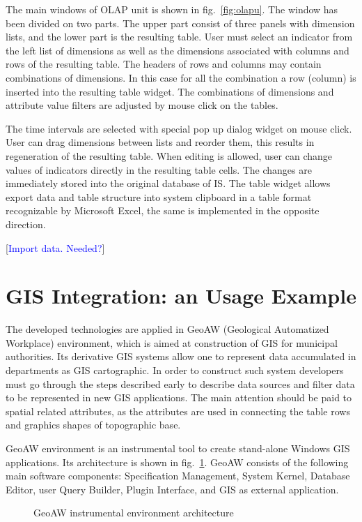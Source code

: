 \documentclass[conference]{IEEEtran}
\newcommand{\e}[2][fcolor]{\textcolor{pcolor}{[}\textcolor{#1}{#2}\textcolor{pcolor}{]}}
\begin{document}
The main windows of OLAP unit is shown in fig.~\ref{fig:olapu}.  The window has been divided on two parts.  The upper part consist of three panels with dimension lists, and the lower part is the resulting table.  User must select an indicator from the left list of dimensions as well as the dimensions associated with columns and rows of the resulting table.  The headers of rows and columns may contain combinations of dimensions.  In this case for all the combination a row (column) is inserted into the resulting table widget.  The combinations of dimensions and attribute value filters are adjusted by mouse click on the tables.

The time intervals are selected with special pop up dialog widget on mouse click.  User can drag dimensions between lists and reorder them, this results in regeneration of the resulting table.  When editing is allowed, user can change values of indicators directly in the resulting table cells.  The changes are immediately stored into the original database of IS.  The table widget allows export data and table structure into system clipboard in a table format recognizable by Microsoft Excel, the same is implemented in the opposite direction.

\e[blue]{Import data. Needed?}


\section{GIS Integration: an Usage Example}
\label{sec:gis-integration}

The developed technologies are applied in GeoAW (Geological Automatized Workplace) environment, which is aimed at construction of GIS for municipal authorities.  Its derivative GIS systems allow one to represent data accumulated in departments as GIS cartographic.  In order to construct such system developers must go through the steps described early to describe data sources and filter data to be represented in new GIS applications.  The main attention should be paid to spatial related attributes, as the attributes are used in connecting the table rows and graphics shapes of topographic base.

GeoAW environment is an instrumental tool to create stand-alone Windows GIS applications.  Its architecture is shown in fig.~\ref{fig:architecture}.  GeoAW consists of the following main software components: Specification Management,  System Kernel, Database Editor, user Query Builder, Plugin Interface, and GIS as external application.
\begin{figure}[bt]
  \centering
  \def\svgwidth{\linewidth}
  \tiny\sffamily
  \def\db{Database}
  \def\spec{Specification}
  \def\sce{\vtop{Specification\break Management}}
  \def\kerne{Kernel}
  \def\bde{\vtop{Database\break Editor}}
  \def\qb{\vtop{Query\break Builder}}
  \def\map{GIS}
  \def\gb{Graphic Base}
  \def\plug{Plugins}
  \def\intfs{\vtop{Plugin\break Interface}}
  
  \caption{GeoAW instrumental environment architecture}
  \label{fig:architecture}
\end{figure}
\end{document}
